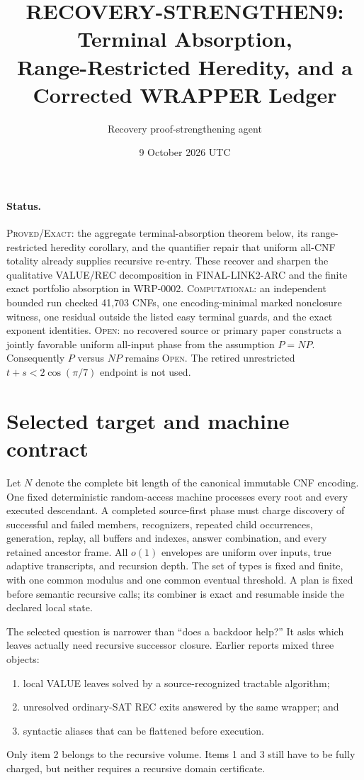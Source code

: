 \documentclass[11pt]{article}
\title{RECOVERY-STRENGTHEN9: Terminal Absorption,\\Range-Restricted Heredity, and a Corrected WRAPPER Ledger}
\author{Recovery proof-strengthening agent}
\date{9 October 2026 UTC}
\begin{document}
\sloppy\maketitle

\paragraph{Status.}
\textsc{Proved/Exact}: the aggregate terminal-absorption theorem below, its
range-restricted heredity corollary, and the quantifier repair that uniform
all-CNF totality already supplies recursive re-entry.  These recover and
sharpen the qualitative VALUE/REC decomposition in FINAL-LINK2-ARC and the
finite exact portfolio absorption in WRP-0002.  \textsc{Computational}: an
independent bounded run checked 41,703 CNFs, one encoding-minimal marked
nonclosure witness, one residual outside the listed easy terminal guards,
and the exact exponent identities.  \textsc{Open}: no recovered source or
primary paper constructs a jointly favorable uniform all-input phase from
the assumption $P=NP$.  Consequently $P$ versus $NP$ remains \textsc{Open}.
The retired unrestricted $t+s<2\cos(\pi/7)$ endpoint is not used.

\section{Selected target and machine contract}

Let $N$ denote the complete bit length of the canonical immutable CNF
encoding.  One fixed deterministic random-access machine processes every
root and every executed descendant.  A completed source-first phase must
charge discovery of successful and failed members, recognizers, repeated
child occurrences, generation, replay, all buffers and indexes, answer
combination, and every retained ancestor frame.  All $o(1)$ envelopes are
uniform over inputs, true adaptive transcripts, and recursion depth.  The
set of types is fixed and finite, with one common modulus and one common
eventual threshold.  A plan is fixed before semantic recursive calls; its
combiner is exact and resumable inside the declared local state.

The selected question is narrower than ``does a backdoor help?''  It asks
which leaves actually need recursive successor closure.  Earlier reports
mixed three objects:
\begin{enumerate}
  \item local VALUE leaves solved by a source-recognized tractable algorithm;
  \item unresolved ordinary-SAT REC exits answered by the same wrapper; and
  \item syntactic aliases that can be flattened before execution.
\end{enumerate}
Only item 2 belongs to the recursive volume.  Items 1 and 3 still have to be
fully charged, but neither requires a recursive domain certificate.
\end{document}
